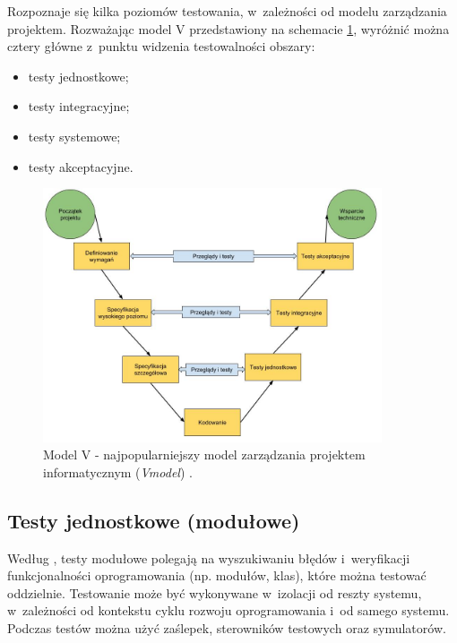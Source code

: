 Rozpoznaje się kilka poziomów testowania, w~zależności od modelu zarządzania projektem. Rozważając model V przedstawiony na schemacie \ref{fig:model_v}, wyróżnić można cztery główne  z~punktu widzenia testowalności obszary:

\begin{itemize}
\item
testy jednostkowe;
\item
testy integracyjne;
\item
testy systemowe;
\item
testy akceptacyjne.

\end{itemize}

\begin{figure}[!htb]
    \centering
    \includegraphics[width=10cm]{imgs/ch2_model_v_pl.jpg}
    \caption{Model V - najpopularniejszy model zarządzania projektem informatycznym (\textit{V\-model}) \cite{website:android:modelv}.}
    \label{fig:model_v}
\end{figure} 

\newpage
\subsection{Testy jednostkowe (modułowe)}

Według \cite{bib:sylabus:foundation}, testy modułowe polegają na wyszukiwaniu błędów i~weryfikacji funkcjonalności oprogramowania (np. modułów, klas), które można testować oddzielnie. Testowanie może być wykonywane w~izolacji od reszty systemu, w~zależności od kontekstu cyklu rozwoju oprogramowania i~od samego systemu. Podczas testów można użyć zaślepek, sterowników testowych oraz symulatorów. 

